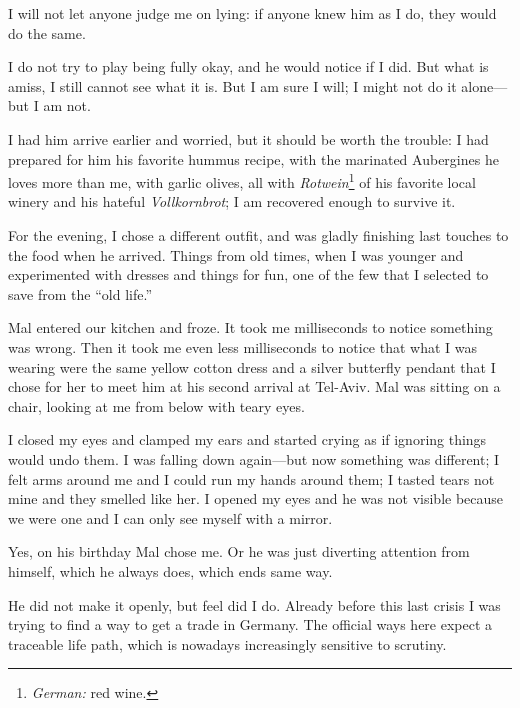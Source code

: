 I will not let anyone judge me on lying: if anyone knew him as I do, they would do the same.

I do not try to play being fully okay, and he would notice if I did. But what is amiss, I still cannot see what it is. But I am sure I will; I might not do it alone---but I am not.

%
%
%

%
%

I had him arrive earlier and worried, but it should be worth the trouble: I had prepared for him his favorite hummus recipe, with the marinated Aubergines he loves more than me, with garlic olives, all with \emph{Rotwein}\thinspace\footnote{\emph{German:} red wine.} of his favorite local winery and his hateful \emph{Vollkornbrot}; I am recovered enough to survive it.

For the evening, I chose a different outfit, and was gladly finishing last touches to the food when he arrived. Things from old times, when I was younger and experimented with dresses and things for fun, one of the few that I selected to save from the \enquote{old life.}

Mal entered our kitchen and froze. It took me milliseconds to notice something was wrong. Then it took me even less milliseconds to notice that what I was wearing were the same yellow cotton dress and a silver butterfly pendant that I chose for her to meet him at his second arrival at Tel-Aviv. Mal was sitting on a chair, looking at me from below with teary eyes.

I closed my eyes and clamped my ears and started crying as if ignoring things would undo them. I was falling down again---but now something was different; I felt arms around me and I could run my hands around them; I tasted tears not mine and they smelled like her. I opened my eyes and he was not visible because we were one and I can only see myself with a mirror.

Yes, on his birthday Mal chose me. Or he was just diverting attention from himself, which he always does, which ends same way.

He did not make it openly, but feel did I do. Already before this last crisis I was trying to find a way to get a trade in Germany. The official ways here expect a traceable life path, which is nowadays increasingly sensitive to scrutiny.

